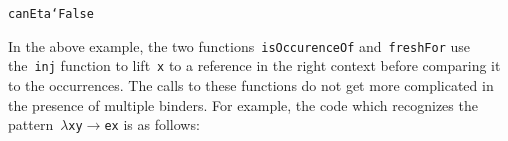 \documentclass[9pt,preprint,authoryear]{sigplanconf}
\begin{document}
{{{}\vphantom{$\{$}}}\textcolor[rgb]{0,0,0.80}{\texttt{canEta}}\textcolor[rgb]{0,0,0.80}{\texttt{\mbox{\hspace{0.50em}}}}\textcolor[rgb]{0,0,0.80}{\texttt{\makebox[1.22ex][c]{\_{}}}}\textcolor[rgb]{0,0,0.80}{\texttt{\mbox{\hspace{0.50em}}}}\textcolor[cmyk]{0,0.65,0.99,0}{\texttt{{\char `\=}}}\textcolor[rgb]{0,0,0.80}{\texttt{\mbox{\hspace{0.50em}}}}\textcolor[rgb]{0.70,0.13,0.13}{\texttt{False}}\textcolor[rgb]{0,0,0.80}{\texttt{{\nopagebreak \newline%
}\vphantom{$\{$}}}%


%
In the above example, the two functions{~}\textcolor[rgb]{0,0,0.80}{\texttt{isOccurenceOf}}    and{~}\textcolor[rgb]{0,0,0.80}{\texttt{freshFor}} use the{~}\textcolor[rgb]{0,0,0.80}{\texttt{inj}} function to lift{~}\textcolor[rgb]{0,0,0.80}{\texttt{x}} to
    a reference in the right context before comparing it to the
    occurrences. The calls to these functions do not get more complicated
    in the presence of multiple binders. For example, the code which
    recognizes the pattern{~}\textcolor[cmyk]{0,0.65,0.99,0}{\texttt{$ \lambda $}}\textcolor[rgb]{0,0,0.80}{\texttt{\mbox{\hspace{0.50em}}}}\textcolor[rgb]{0,0,0.80}{\texttt{x}}\textcolor[rgb]{0,0,0.80}{\texttt{\mbox{\hspace{0.50em}}}}\textcolor[rgb]{0,0,0.80}{\texttt{y}}\textcolor[rgb]{0,0,0.80}{\texttt{\mbox{\hspace{0.50em}}}}\textcolor[cmyk]{0,0.65,0.99,0}{\texttt{$ \rightarrow $}}\textcolor[rgb]{0,0,0.80}{\texttt{\mbox{\hspace{0.50em}}}}\textcolor[rgb]{0,0,0.80}{\texttt{e}}\textcolor[rgb]{0,0,0.80}{\texttt{\mbox{\hspace{0.50em}}}}\textcolor[rgb]{0,0,0.80}{\texttt{x}} is as follows{:}%


{\nopagebreak }
\end{document}
